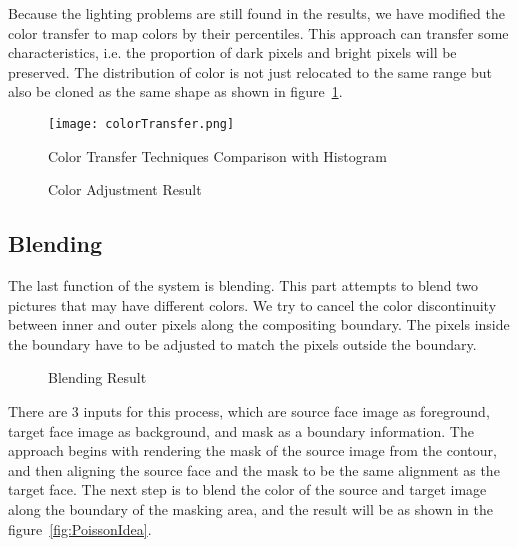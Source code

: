 Because the lighting problems are still found in the results, we have modified the color transfer to map colors by their percentiles. This approach can transfer some characteristics, i.e. the proportion of dark pixels and bright pixels will be preserved. The distribution of color is not just relocated to the same range but also be cloned as the same shape as shown in figure~\ref{fig:ColorTransfer}.

\begin{figure}[htb]
   \centering
   \texttt{[image: colorTransfer.png]}
   \caption{Color Transfer Techniques Comparison with Histogram}
   \label{fig:ColorTransfer}
\end{figure}

\begin{figure}[htb]
  \centering
  \caption{Color Adjustment Result}
  \label{fig:ColorAdjustmentResult}
\end{figure}

\subsection{Blending}

\hspace{0.5in}The last function of the system is blending. This part attempts to blend two pictures that may have different colors. We try to cancel the color discontinuity between inner and outer pixels along the compositing boundary. The pixels inside the boundary have to be adjusted to match the pixels outside the boundary.

\begin{figure}[htb]
  \centering
  \caption{Blending Result}
  \label{fig:BlendingResult}
\end{figure}

There are 3 inputs for this process, which are source face image as foreground, target face image as background, and mask as a boundary information. The approach begins with rendering the mask of the source image from the contour, and then aligning the source face and the mask to be the same alignment as the target face. The next step is to blend the color of the source and target image along the boundary of the masking area, and the result will be as shown in the figure~\ref{fig:PoissonIdea}.

